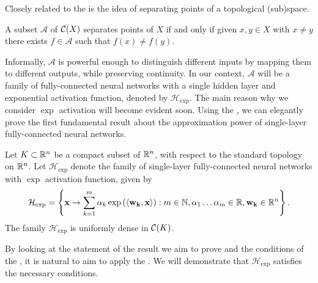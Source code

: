 Closely related to the  is the idea of separating points of a topological (sub)space.
\begin{definition*}[separation on $\C(X)$]
A subset $\mathcal{A}$ of $\C(X)$ separates points of $X$ if and only if given $x, y \in X$ with $x \neq y$ there exists $f \in \mathcal{A}$ such that $f(x) \neq f(y)$.
\end{definition*}
Informally, $\mathcal{A}$ is powerful enough to distinguish different inputs by mapping them to different outputs, while preserving continuity. In our context, $\mathcal{A}$ will be a family of fully-connected neural networks with a single hidden layer and exponential activation function, denoted by $\mathcal{H}_{\exp}$. The main reason why we consider $\exp$ activation will become evident soon. Using the , we can elegantly prove the first fundamental result about the approximation power of single-layer fully-connected neural networks.
\begin{theorem}
\label{thm:universality:stone-weierstrass:uap}
Let $K \subset {\mathbb R}^n$ be a compact subset of ${\mathbb R}^n$, with respect to the standard topology on ${\mathbb R}^n$. Let $\mathcal{H}_{\exp}$ denote the family of single-layer fully-connected neural networks with $\exp$ activation function, given by \begin{align*}
    \mathcal{H}_{\exp} = \left \{ \mathbf{x} \to \sum_{k=1}^{m} \alpha_k \exp{\left (\langle \mathbf{w_k}, \mathbf{x} \rangle \right)} : m \in {\mathbb N}, \alpha_1 \ldots \alpha_m \in {\mathbb R}, \mathbf{w_k} \in {\mathbb R}^n \right \}.
\end{align*}
The family $\mathcal{H}_{\exp}$ is uniformly dense in ${\mathcal C}(K)$.
\end{theorem}
\begin{proof-idea*}
By looking at the statement of the result we aim to prove and the conditions of the , it is natural to aim to apply the . We will demonstrate that $\mathcal{H}_{\exp}$ satisfies the necessary conditions.
\end{proof-idea*}
\pagebreak
